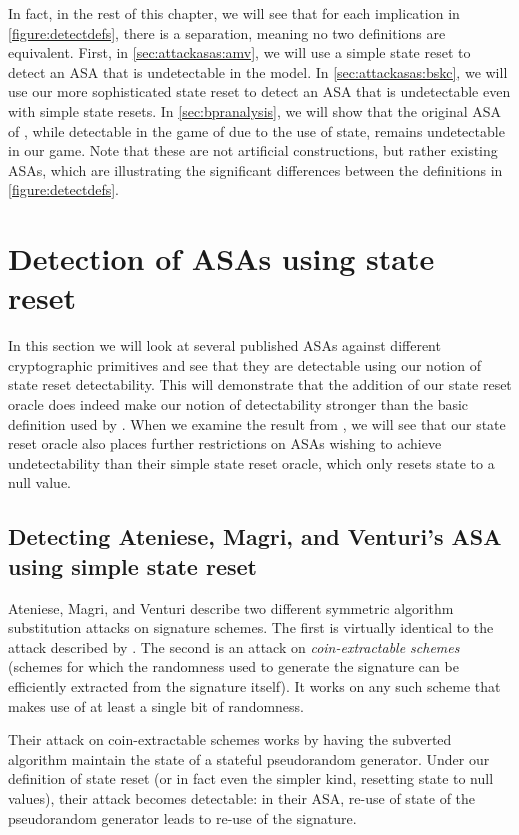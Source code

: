 In fact, in the rest of this chapter, we will see that for each implication in  \autoref{figure:detectdefs}, there is a separation, meaning no two definitions are equivalent. First, in \autoref{sec:attackasas:amv}, we will use a simple state reset to detect an ASA that is undetectable in the \cite{C:BelPatRog14} model. In \autoref{sec:attackasas:bskc}, we will use our more sophisticated state reset to detect an ASA that is undetectable even with simple state resets. In \autoref{sec:bpranalysis}, we will show that the original ASA of \cite{C:BelPatRog14}, while detectable in the game of \cite{CCS:BelJaeKan15} due to the use of state, remains undetectable in our game. Note that these are not artificial constructions, but rather existing ASAs, which are illustrating the significant differences between the definitions in \autoref{figure:detectdefs}.


\section{Detection of ASAs using state reset} \label{sec:attackasas}
In this section we will look at several published ASAs against different cryptographic primitives and see that they are detectable using our notion of state reset detectability. This will demonstrate that the addition of our state reset oracle does indeed make our notion of detectability stronger than the basic definition used by \cite{C:BelPatRog14}. When we examine the result from \cite{BSKC2019}, we will see that our state reset oracle also places further restrictions on ASAs wishing to achieve undetectability than their simple state reset oracle, which only resets state to a null value.


\subsection{Detecting Ateniese, Magri, and Venturi's ASA using simple state reset} \label{sec:attackasas:amv}
Ateniese, Magri, and Venturi \cite{CCS:AteMagVen15} describe two different symmetric algorithm substitution attacks on signature schemes. The first is virtually identical to the attack described by \cite{CCS:BelJaeKan15}. The second is an attack on \emph{coin-extractable schemes} (schemes for which the randomness used to generate the signature can be efficiently extracted from the signature itself). It works on any such scheme that makes use of at least a single bit of randomness.

Their attack on coin-extractable schemes works by having the subverted algorithm maintain the state of a stateful pseudorandom generator. Under our definition of state reset (or in fact even the simpler kind, resetting state to null values), their attack becomes detectable: in their ASA, re-use of state of the pseudorandom generator leads to re-use of the signature.

